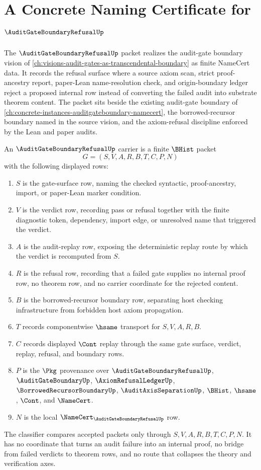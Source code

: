 \chapter{A Concrete Naming Certificate for $\AuditGateBoundaryRefusalUp$}
\label{ch:concrete-instances-audit-gate-boundary-refusal-namecert}

The $\AuditGateBoundaryRefusalUp$ packet realizes the audit-gate boundary vision of \autoref{ch:visions-audit-gates-as-transcendental-boundary} as finite NameCert data. It records the refusal surface where a source axiom scan, strict proof-ancestry report, paper-Lean name-resolution check, and origin-boundary ledger reject a proposed internal row instead of converting the failed audit into substrate theorem content. The packet sits beside the existing audit-gate boundary of \autoref{ch:concrete-instances-auditgateboundary-namecert}, the borrowed-recursor boundary named in the source vision, and the axiom-refusal discipline enforced by the Lean and paper audits.

\begin{definition}
\label{def:audit-gate-boundary-refusal-carrier}
An $\AuditGateBoundaryRefusalUp$ carrier is a finite $\BHist$ packet
$$
G=(S,V,A,R,B,T,C,P,N)
$$
with the following displayed rows:
\begin{enumerate}
\item $S$ is the gate-surface row, naming the checked syntactic, proof-ancestry, import, or paper-Lean marker condition.
\item $V$ is the verdict row, recording pass or refusal together with the finite diagnostic token, dependency, import edge, or unresolved name that triggered the verdict.
\item $A$ is the audit-replay row, exposing the deterministic replay route by which the verdict is recomputed from $S$.
\item $R$ is the refusal row, recording that a failed gate supplies no internal proof row, no theorem row, and no carrier coordinate for the rejected content.
\item $B$ is the borrowed-recursor boundary row, separating host checking infrastructure from forbidden host axiom propagation.
\item $T$ records componentwise $\hsame$ transport for $S,V,A,R,B$.
\item $C$ records displayed $\Cont$ replay through the same gate surface, verdict, replay, refusal, and boundary rows.
\item $P$ is the $\Pkg$ provenance over $\AuditGateBoundaryRefusalUp$, $\AuditGateBoundaryUp$, $\AxiomRefusalLedgerUp$, $\BorrowedRecursorBoundaryUp$, $\AuditAxisSeparationUp$, $\BHist$, $\hsame$, $\Cont$, and $\NameCert$.
\item $N$ is the local $\NameCert_{\AuditGateBoundaryRefusalUp}$ row.
\end{enumerate}
The classifier compares accepted packets only through $S,V,A,R,B,T,C,P,N$. It has no coordinate that turns an audit failure into an internal proof, no bridge from failed verdicts to theorem rows, and no route that collapses the theory and verification axes.
\end{definition}

